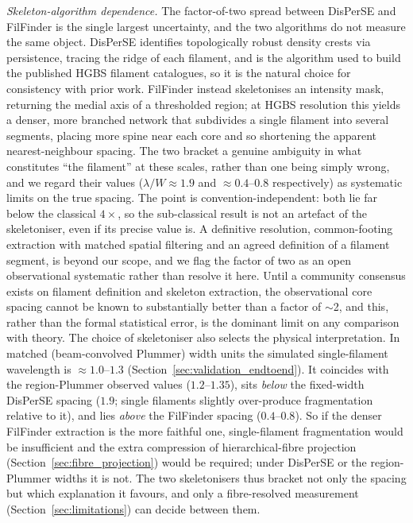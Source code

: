 \documentclass[usenatbib,twoside,twocolumn]{mnras}
\begin{document}
\emph{Skeleton-algorithm dependence.} The factor-of-two spread between DisPerSE and FilFinder is the single largest uncertainty, and the two algorithms do not measure the same object. DisPerSE identifies topologically robust density crests via persistence, tracing the ridge of each filament, and is the algorithm used to build the published HGBS filament catalogues, so it is the natural choice for consistency with prior work. FilFinder instead skeletonises an intensity mask, returning the medial axis of a thresholded region; at HGBS resolution this yields a denser, more branched network that subdivides a single filament into several segments, placing more spine near each core and so shortening the apparent nearest-neighbour spacing. The two bracket a genuine ambiguity in what constitutes ``the filament'' at these scales, rather than one being simply wrong, and we regard their values ($\lambda/W\approx1.9$ and $\approx0.4$--$0.8$ respectively) as systematic limits on the true spacing. The point is convention-independent: both lie far below the classical $4\times$, so the sub-classical result is not an artefact of the skeletoniser, even if its precise value is. A definitive resolution, common-footing extraction with matched spatial filtering and an agreed definition of a filament segment, is beyond our scope, and we flag the factor of two as an open observational systematic rather than resolve it here. Until a community consensus exists on filament definition and skeleton extraction, the observational core spacing cannot be known to substantially better than a factor of $\sim$2, and this, rather than the formal statistical error, is the dominant limit on any comparison with theory. The choice of skeletoniser also selects the physical interpretation. In matched (beam-convolved Plummer) width units the simulated single-filament wavelength is $\approx1.0$--$1.3$ (Section~\ref{sec:validation_endtoend}). It coincides with the region-Plummer observed values ($1.2$--$1.35$), sits \emph{below} the fixed-width DisPerSE spacing ($1.9$; single filaments slightly over-produce fragmentation relative to it), and lies \emph{above} the FilFinder spacing ($0.4$--$0.8$). So if the denser FilFinder extraction is the more faithful one, single-filament fragmentation would be insufficient and the extra compression of hierarchical-fibre projection (Section~\ref{sec:fibre_projection}) would be required; under DisPerSE or the region-Plummer widths it is not. The two skeletonisers thus bracket not only the spacing but which explanation it favours, and only a fibre-resolved measurement (Section~\ref{sec:limitations}) can decide between them.
\end{document}
